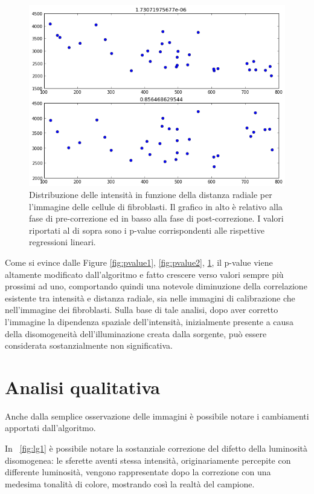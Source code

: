 \begin{figure}
 \centering
 \includegraphics[scale=.50]{img/CAP4pvalue3.png}
 \caption{\small{Distribuzione delle intensità in funzione della distanza radiale per l'immagine delle cellule di fibroblasti. Il grafico in alto è relativo alla fase di pre-correzione ed in basso alla fase di post-correzione. I valori riportati al di sopra sono i p-value corrispondenti alle rispettive regressioni lineari.}}
 \label{fig:pvalue3}
\end{figure}

Come si evince dalle Figure \ref{fig:pvalue1}, \ref{fig:pvalue2}, \ref{fig:pvalue3}, il p-value viene altamente modificato dall'algoritmo e fatto crescere verso valori sempre più prossimi ad uno, comportando quindi una notevole diminuzione della correlazione esistente tra intensità e distanza radiale, sia nelle immagini di calibrazione che nell'immagine dei fibroblasti. 
Sulla base di tale analisi, dopo aver corretto l'immagine la dipendenza spaziale dell'intensità, inizialmente presente a causa della disomogeneità dell'illuminazione creata dalla sorgente, può essere considerata sostanzialmente non significativa.


\section{Analisi qualitativa}

Anche dalla semplice osservazione delle immagini è possibile notare i cambiamenti apportati dall'algoritmo.

In \figurename~\ref{fig:lg1} è possibile notare la sostanziale correzione del difetto della luminosità disomogenea: le sferette aventi stessa intensità, originariamente percepite con differente luminosità, vengono rappresentate dopo la correzione con una medesima tonalità di colore, mostrando così la realtà del campione.

